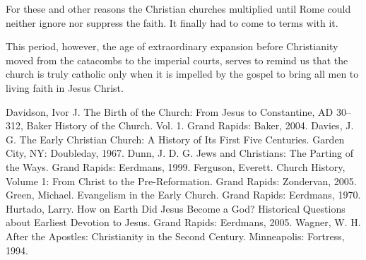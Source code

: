For these and other reasons the Christian churches multiplied until Rome could neither ignore nor
suppress the faith. It finally had to come to terms with it.

This period, however, the age of extraordinary expansion before Christianity moved from the
catacombs to the imperial courts, serves to remind us that the church is truly catholic only when it
is impelled by the gospel to bring all men to living faith in Jesus Christ.

\begin{readinglist}
\entry Davidson, Ivor J. The Birth of the Church: From Jesus to Constantine, AD 30–312, Baker
  History of the Church. Vol. 1. Grand Rapids: Baker, 2004.
\entry Davies, J. G. The Early Christian Church: A History of Its First Five Centuries. Garden City,
  NY: Doubleday, 1967.
\entry Dunn, J. D. G. Jews and Christians: The Parting of the Ways. Grand Rapids: Eerdmans, 1999.
\entry *Ferguson, Everett. Church History, Volume 1: From Christ to the Pre-Reformation. Grand
  Rapids: Zondervan, 2005.
\entry Green, Michael. Evangelism in the Early Church. Grand Rapids: Eerdmans, 1970. Hurtado, Larry.
  How on Earth Did Jesus Become a God? Historical Questions about Earliest Devotion to Jesus. Grand
  Rapids: Eerdmans, 2005.
\entry Wagner, W. H. After the Apostles: Christianity in the Second Century. Minneapolis: Fortress,
  1994.
\end{readinglist}
